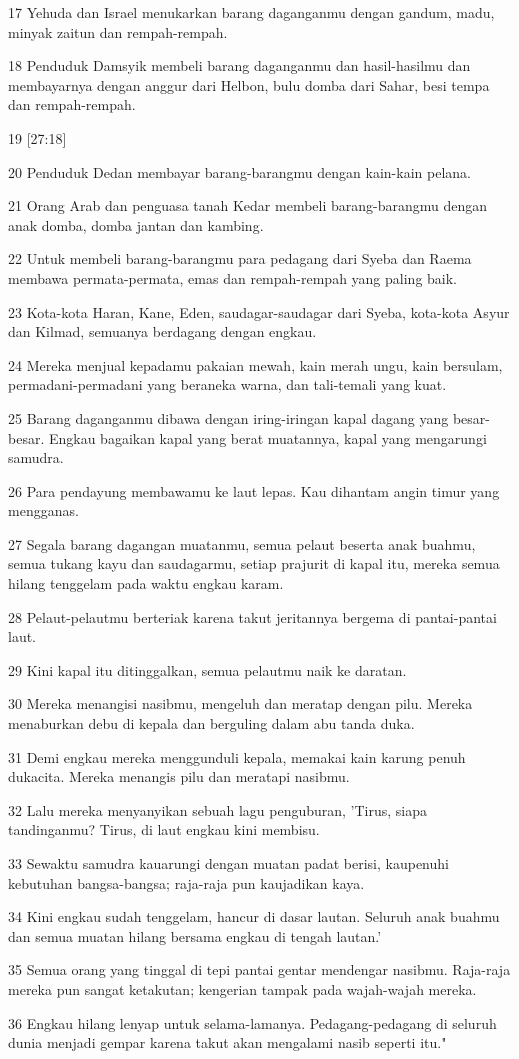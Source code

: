 \par 17 Yehuda dan Israel menukarkan barang daganganmu dengan gandum, madu, minyak zaitun dan rempah-rempah.
\par 18 Penduduk Damsyik membeli barang daganganmu dan hasil-hasilmu dan membayarnya dengan anggur dari Helbon, bulu domba dari Sahar, besi tempa dan rempah-rempah.
\par 19 [27:18]
\par 20 Penduduk Dedan membayar barang-barangmu dengan kain-kain pelana.
\par 21 Orang Arab dan penguasa tanah Kedar membeli barang-barangmu dengan anak domba, domba jantan dan kambing.
\par 22 Untuk membeli barang-barangmu para pedagang dari Syeba dan Raema membawa permata-permata, emas dan rempah-rempah yang paling baik.
\par 23 Kota-kota Haran, Kane, Eden, saudagar-saudagar dari Syeba, kota-kota Asyur dan Kilmad, semuanya berdagang dengan engkau.
\par 24 Mereka menjual kepadamu pakaian mewah, kain merah ungu, kain bersulam, permadani-permadani yang beraneka warna, dan tali-temali yang kuat.
\par 25 Barang daganganmu dibawa dengan iring-iringan kapal dagang yang besar-besar. Engkau bagaikan kapal yang berat muatannya, kapal yang mengarungi samudra.
\par 26 Para pendayung membawamu ke laut lepas. Kau dihantam angin timur yang mengganas.
\par 27 Segala barang dagangan muatanmu, semua pelaut beserta anak buahmu, semua tukang kayu dan saudagarmu, setiap prajurit di kapal itu, mereka semua hilang tenggelam pada waktu engkau karam.
\par 28 Pelaut-pelautmu berteriak karena takut jeritannya bergema di pantai-pantai laut.
\par 29 Kini kapal itu ditinggalkan, semua pelautmu naik ke daratan.
\par 30 Mereka menangisi nasibmu, mengeluh dan meratap dengan pilu. Mereka menaburkan debu di kepala dan berguling dalam abu tanda duka.
\par 31 Demi engkau mereka menggunduli kepala, memakai kain karung penuh dukacita. Mereka menangis pilu dan meratapi nasibmu.
\par 32 Lalu mereka menyanyikan sebuah lagu penguburan, 'Tirus, siapa tandinganmu? Tirus, di laut engkau kini membisu.
\par 33 Sewaktu samudra kauarungi dengan muatan padat berisi, kaupenuhi kebutuhan bangsa-bangsa; raja-raja pun kaujadikan kaya.
\par 34 Kini engkau sudah tenggelam, hancur di dasar lautan. Seluruh anak buahmu dan semua muatan hilang bersama engkau di tengah lautan.'
\par 35 Semua orang yang tinggal di tepi pantai gentar mendengar nasibmu. Raja-raja mereka pun sangat ketakutan; kengerian tampak pada wajah-wajah mereka.
\par 36 Engkau hilang lenyap untuk selama-lamanya. Pedagang-pedagang di seluruh dunia menjadi gempar karena takut akan mengalami nasib seperti itu."

